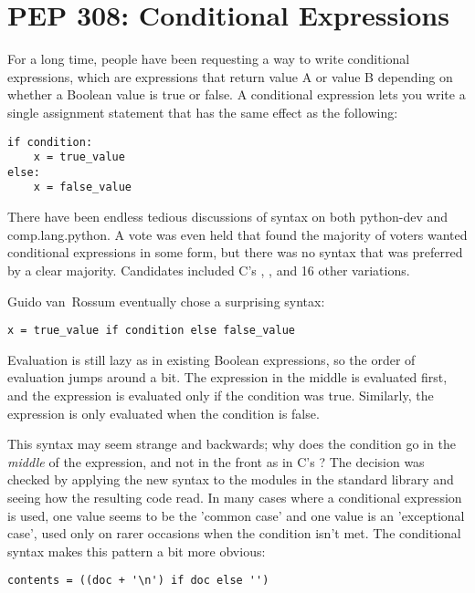 \documentclass{howto}
\begin{document}
\section{PEP 308: Conditional Expressions\label{pep-308}}

For a long time, people have been requesting a way to write
conditional expressions, which are expressions that return value A or
value B depending on whether a Boolean value is true or false.  A
conditional expression lets you write a single assignment statement
that has the same effect as the following:

\begin{verbatim}
if condition:
    x = true_value
else:
    x = false_value
\end{verbatim}

There have been endless tedious discussions of syntax on both
python-dev and comp.lang.python.  A vote was even held that found the
majority of voters wanted conditional expressions in some form,
but there was no syntax that was preferred by a clear majority.
Candidates included C's ,
, and 16 other variations.

Guido van~Rossum eventually chose a surprising syntax:

\begin{verbatim}
x = true_value if condition else false_value
\end{verbatim}

Evaluation is still lazy as in existing Boolean expressions, so the
order of evaluation jumps around a bit.  The 
expression in the middle is evaluated first, and the 
expression is evaluated only if the condition was true.  Similarly,
the  expression is only evaluated when the condition
is false.

This syntax may seem strange and backwards; why does the condition go
in the \emph{middle} of the expression, and not in the front as in C's
?  The decision was checked by applying the new syntax
to the modules in the standard library and seeing how the resulting
code read.  In many cases where a conditional expression is used, one
value seems to be the 'common case' and one value is an 'exceptional
case', used only on rarer occasions when the condition isn't met.  The
conditional syntax makes this pattern a bit more obvious:

\begin{verbatim}
contents = ((doc + '\n') if doc else '')
\end{verbatim}
\end{document}
